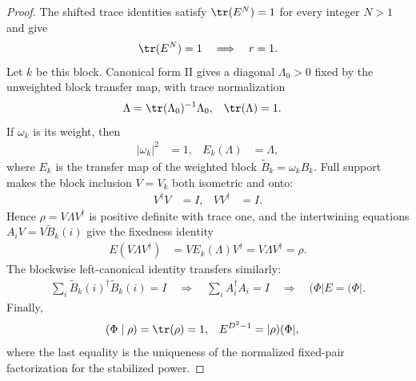 \begin{proof}\leanok
    The shifted trace identities satisfy $\tr(E^N)=1$ for every integer
    $N>1$ and give
    \begin{align}
        \tr(E^N)=1
        \quad\Longrightarrow\quad
        r=1.
    \end{align}
    Let $k$ be this block. Canonical form II gives a diagonal
    $\Lambda_0>0$ fixed by the unweighted block transfer map, with trace normalization
    \begin{align}
        \Lambda & =\tr(\Lambda_0)^{-1}\Lambda_0,
                & \tr(\Lambda)                   & =1.
    \end{align}
    If $\omega_k$ is its weight, then
    \begin{align}
        \lvert\omega_k\rvert^2 & =1,
                               & E_k(\Lambda) & =\Lambda,
    \end{align}
    where $E_k$ is the transfer map of the weighted block
    $\widetilde B_k=\omega_k B_k$. Full support makes the block inclusion
    $V=V_k$ both isometric and onto:
    \begin{align}
        V^\dagger V & =I,
                    & VV^\dagger & =I.
    \end{align}
    Hence $\rho=V\Lambda V^\dagger$ is positive definite with trace one, and
    the intertwining equations $A_iV=V\widetilde B_k(i)$ give the fixedness
    identity
    \begin{align}
        E(V\Lambda V^\dagger)
         & =V E_k(\Lambda)V^\dagger
        =V\Lambda V^\dagger
        =\rho.
    \end{align}
    The blockwise left-canonical identity transfers similarly:
    \begin{align}
        \sum_i \widetilde B_k(i)^\dagger\widetilde B_k(i)=I
        \quad\Longrightarrow\quad
        \sum_i A_i^\dagger A_i=I
        \quad\Longrightarrow\quad
        (\Phi\rvert E=(\Phi\rvert.
    \end{align}
    Finally,
    \begin{align}
        (\Phi\mid\rho) & =\tr(\rho)=1,
                       & E^{D^2-1}     & =\lvert\rho)(\Phi\rvert,
    \end{align}
    where the last equality is the uniqueness of the normalized fixed-pair
    factorization for the stabilized power.
\end{proof}

